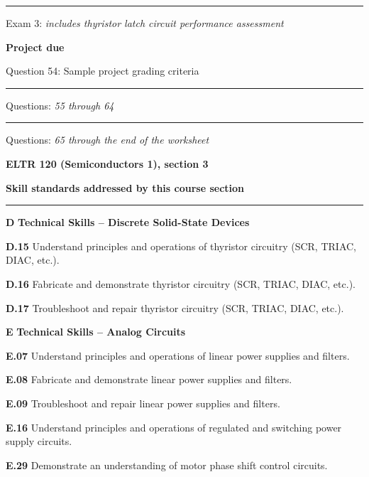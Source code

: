 \vskip 10pt
\hrule \vskip 5pt
\noindent
{}

\hskip 10pt Exam 3: {\it includes thyristor latch circuit performance assessment}
 
\hskip 10pt {\bf Project due}

\hskip 10pt Question 54: Sample project grading criteria
 
\vskip 10pt

\hrule \vskip 5pt
\noindent
{}

\hskip 10pt Questions: {\it 55 through 64}
 
\vskip 10pt
\hrule \vskip 5pt
\noindent
{}

\hskip 10pt Questions: {\it 65 through the end of the worksheet}
 
\vskip 10pt












\vfil \eject

\centerline{\bf ELTR 120 (Semiconductors 1), section 3} \bigskip 
 
\vskip 10pt

\noindent
{\bf Skill standards addressed by this course section}

\vskip 5pt

\hrule \vskip 10pt
\noindent
{}

\vskip 5pt

\medskip
\item{\bf D} {\bf Technical Skills -- Discrete Solid-State Devices}
\item{\bf D.15} Understand principles and operations of thyristor circuitry (SCR, TRIAC, DIAC, etc.).
\item{\bf D.16} Fabricate and demonstrate thyristor circuitry (SCR, TRIAC, DIAC, etc.).
\item{\bf D.17} Troubleshoot and repair thyristor circuitry (SCR, TRIAC, DIAC, etc.).
\item{\bf E} {\bf Technical Skills -- Analog Circuits}
\item{\bf E.07} Understand principles and operations of linear power supplies and filters.
\item{\bf E.08} Fabricate and demonstrate linear power supplies and filters.
\item{\bf E.09} Troubleshoot and repair linear power supplies and filters.
\item{\bf E.16} Understand principles and operations of regulated and switching power supply circuits.
\item{\bf E.29} Demonstrate an understanding of motor phase shift control circuits.
\medskip

